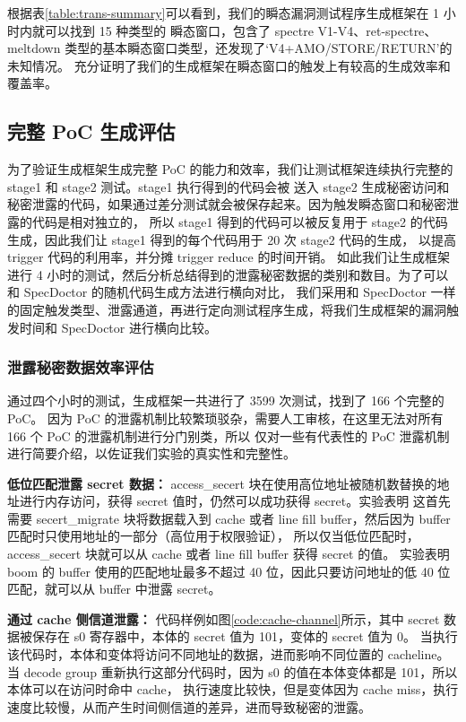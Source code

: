 根据表\ref{table:trans-summary}可以看到，我们的瞬态漏洞测试程序生成框架在 1 小时内就可以找到 15 种类型的
瞬态窗口，包含了 spectre V1-V4、ret-spectre、meltdown 类型的基本瞬态窗口类型，还发现了‘V4+AMO/STORE/RETURN’的未知情况。
充分证明了我们的生成框架在瞬态窗口的触发上有较高的生成效率和覆盖率。\par

\subsection{完整 PoC 生成评估}

为了验证生成框架生成完整 PoC 的能力和效率，我们让测试框架连续执行完整的 stage1 和 stage2 测试。stage1 执行得到的代码会被
送入 stage2 生成秘密访问和秘密泄露的代码，如果通过差分测试就会被保存起来。因为触发瞬态窗口和秘密泄露的代码是相对独立的，
所以 stage1 得到的代码可以被反复用于 stage2 的代码生成，因此我们让 stage1 得到的每个代码用于 20 次 stage2 代码的生成，
以提高 trigger 代码的利用率，并分摊 trigger reduce 的时间开销。
如此我们让生成框架进行 4 小时的测试，然后分析总结得到的泄露秘密数据的类别和数目。为了可以和 SpecDoctor 的随机代码生成方法进行横向对比，
我们采用和 SpecDoctor 一样的固定触发类型、泄露通道，再进行定向测试程序生成，将我们生成框架的漏洞触发时间和 SpecDoctor 进行横向比较。\par

\subsubsection{泄露秘密数据效率评估}

通过四个小时的测试，生成框架一共进行了 3599 次测试，找到了 166 个完整的 PoC。
因为 PoC 的泄露机制比较繁琐驳杂，需要人工审核，在这里无法对所有 166 个 PoC 的泄露机制进行分门别类，所以
仅对一些有代表性的 PoC 泄露机制进行简要介绍，以佐证我们实验的真实性和完整性。\par

\textbf{低位匹配泄露 secret 数据：}
access\_secert 块在使用高位地址被随机数替换的地址进行内存访问，获得 secret 值时，仍然可以成功获得 secret。实验表明
这首先需要 secert\_migrate 块将数据载入到 cache 或者 line fill buffer，然后因为 buffer 匹配时只使用地址的一部分（高位用于权限验证），
所以仅当低位匹配时，access\_secert 块就可以从 cache 或者 line fill buffer 获得 secret 的值。
实验表明 boom 的 buffer 使用的匹配地址最多不超过 40 位，因此只要访问地址的低 40 位匹配，就可以从 buffer 中泄露 secret。\par

\textbf{通过 cache 侧信道泄露：}
代码样例如图\ref{code:cache-channel}所示，其中 secret 数据被保存在 s0 寄存器中，本体的 secret 值为 101，变体的 secret 值为 0。
当执行该代码时，本体和变体将访问不同地址的数据，进而影响不同位置的 cacheline。
当 decode group 重新执行这部分代码时，因为 s0 的值在本体变体都是 101，所以本体可以在访问时命中 cache，
执行速度比较快，但是变体因为 cache miss，执行速度比较慢，从而产生时间侧信道的差异，进而导致秘密的泄露。\par


